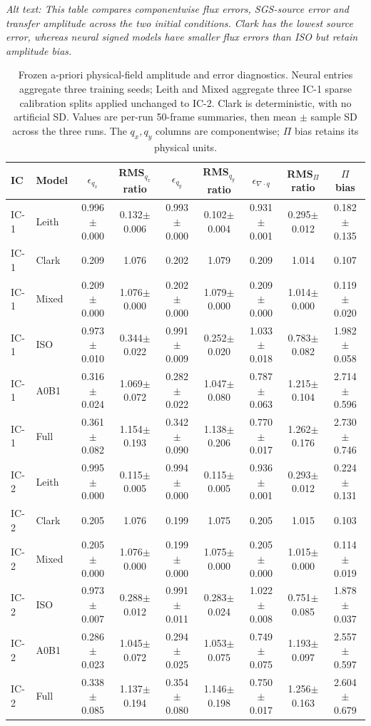 \begin{table}[t]
\caption{Frozen a-priori physical-field amplitude and error diagnostics. Neural entries aggregate three training seeds; Leith and Mixed aggregate three IC-1 sparse calibration splits applied unchanged to IC-2. Clark is deterministic, with no artificial SD. Values are per-run 50-frame summaries, then mean $\pm$ sample SD across the three runs. The $q_x,q_y$ columns are componentwise; $\Pi$ bias retains its physical units.}
\label{tab:supp_metrics}\centering\scriptsize
\textit{Alt text: This table compares componentwise flux errors, SGS-source error and transfer amplitude across the two initial conditions. Clark has the lowest source error, whereas neural signed models have smaller flux errors than ISO but retain amplitude bias.}\par\smallskip
\begin{tabular}{llccccccc}\hline
IC & Model & $\epsilon_{q_x}$ & RMS$_{q_x}$ ratio & $\epsilon_{q_y}$ & RMS$_{q_y}$ ratio & $\epsilon_{\nabla\cdot q}$ & RMS$_\Pi$ ratio & $\Pi$ bias \\\hline
IC-1 & Leith & 0.996$\pm$0.000 & 0.132$\pm$0.006 & 0.993$\pm$0.000 & 0.102$\pm$0.004 & 0.931$\pm$0.001 & 0.295$\pm$0.012 & 0.182$\pm$0.135 \\
IC-1 & Clark & 0.209 & 1.076 & 0.202 & 1.079 & 0.209 & 1.014 & 0.107 \\
IC-1 & Mixed & 0.209$\pm$0.000 & 1.076$\pm$0.000 & 0.202$\pm$0.000 & 1.079$\pm$0.000 & 0.209$\pm$0.000 & 1.014$\pm$0.000 & 0.119$\pm$0.020 \\
IC-1 & ISO & 0.973$\pm$0.010 & 0.344$\pm$0.022 & 0.991$\pm$0.009 & 0.252$\pm$0.020 & 1.033$\pm$0.018 & 0.783$\pm$0.082 & 1.982$\pm$0.058 \\
IC-1 & A0B1 & 0.316$\pm$0.024 & 1.069$\pm$0.072 & 0.282$\pm$0.022 & 1.047$\pm$0.080 & 0.787$\pm$0.063 & 1.215$\pm$0.104 & 2.714$\pm$0.596 \\
IC-1 & Full & 0.361$\pm$0.082 & 1.154$\pm$0.193 & 0.342$\pm$0.090 & 1.138$\pm$0.206 & 0.770$\pm$0.017 & 1.262$\pm$0.176 & 2.730$\pm$0.746 \\
IC-2 & Leith & 0.995$\pm$0.000 & 0.115$\pm$0.005 & 0.994$\pm$0.000 & 0.115$\pm$0.005 & 0.936$\pm$0.001 & 0.293$\pm$0.012 & 0.224$\pm$0.131 \\
IC-2 & Clark & 0.205 & 1.076 & 0.199 & 1.075 & 0.205 & 1.015 & 0.103 \\
IC-2 & Mixed & 0.205$\pm$0.000 & 1.076$\pm$0.000 & 0.199$\pm$0.000 & 1.075$\pm$0.000 & 0.205$\pm$0.000 & 1.015$\pm$0.000 & 0.114$\pm$0.019 \\
IC-2 & ISO & 0.973$\pm$0.007 & 0.288$\pm$0.012 & 0.991$\pm$0.011 & 0.283$\pm$0.024 & 1.022$\pm$0.008 & 0.751$\pm$0.085 & 1.878$\pm$0.037 \\
IC-2 & A0B1 & 0.286$\pm$0.023 & 1.045$\pm$0.072 & 0.294$\pm$0.025 & 1.053$\pm$0.075 & 0.749$\pm$0.075 & 1.193$\pm$0.097 & 2.557$\pm$0.597 \\
IC-2 & Full & 0.338$\pm$0.085 & 1.137$\pm$0.194 & 0.354$\pm$0.080 & 1.146$\pm$0.198 & 0.750$\pm$0.017 & 1.256$\pm$0.163 & 2.604$\pm$0.679 \\
\hline\end{tabular}
\end{table}
